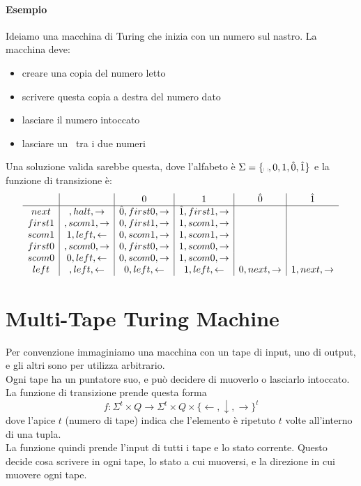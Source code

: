 \documentclass{article}
\begin{document}
\paragraph{Esempio}
Ideiamo una macchina di Turing che inizia con un numero sul nastro. La macchina deve:
\begin{itemize}
    \item creare una copia del numero letto
    \item scrivere questa copia a destra del numero dato
    \item lasciare il numero intoccato
    \item lasciare un \textvisiblespace\ tra i due numeri
\end{itemize}

Una soluzione valida sarebbe questa, dove l'alfabeto è $\Sigma=\{\text\textvisiblespace,0,1,\hat 0, \hat 1\}$ e la funzione di transizione è:
\[
    \begin{array}{c|c|c|c|c|c}
        & \textvisiblespace & 0 & 1 & \hat 0 & \hat 1 \\
        \hline
        next & \textvisiblespace,halt,\rightarrow & \hat 0,first0,\rightarrow &\hat 1,first1,\rightarrow & & \\
        first1 & \textvisiblespace,scom1,\rightarrow & 0,first1,\rightarrow & 1,scom1,\rightarrow & & \\
        scom1 & 1,left,\leftarrow & 0,scom1,\rightarrow & 1,scom1,\rightarrow & & \\
        first0 & \textvisiblespace,scom0,\rightarrow & 0,first0,\rightarrow & 1,scom0,\rightarrow & & \\
        scom0 & 0,left,\leftarrow & 0,scom0,\rightarrow & 1,scom0,\rightarrow & & \\
        left & \textvisiblespace,left,\leftarrow & 0,left,\leftarrow & 1,left,\leftarrow & 0,next,\rightarrow & 1,next,\rightarrow \\

    \end{array}
\]

\section {Multi-Tape Turing Machine}\label{sec: multitape}
Per convenzione immaginiamo una macchina con un tape di input, uno di output, e gli altri sono per utilizza arbitrario. \\
Ogni tape ha un puntatore suo, e può decidere di muoverlo o lasciarlo intoccato.
La funzione di transizione prende questa forma
\large\[
    f: \Sigma^t\times Q \to \Sigma^t\times Q \times \{\leftarrow, \downarrow, \rightarrow\}^t
\]
\normalsize
dove l'apice $t$ (numero di tape) indica che l'elemento è ripetuto $t$ volte all'interno di una tupla. \\
La funzione quindi prende l'input di tutti i tape e lo stato corrente. Questo decide cosa scrivere in ogni tape, lo stato a cui muoversi, e la direzione in cui muovere ogni tape.
\end{document}
